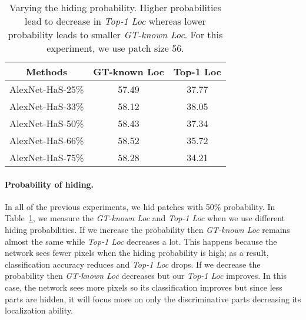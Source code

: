 \documentclass[10pt,twocolumn,letterpaper]{article}
\begin{document}
\begin{table}[t!]
              \begin{center}
                  \footnotesize
                  \begin{tabular}{| c | c | c|}
                  \hline    	
                  Methods & GT-known Loc &  Top-1 Loc\\
                  \hline

                  AlexNet-HaS-25\%            & 57.49 & 37.77  \\
                  AlexNet-HaS-33\%          & 58.12 & 38.05  \\
                  AlexNet-HaS-50\%            & 58.43 & 37.34  \\
                  AlexNet-HaS-66\%            &  58.52  & 35.72  \\
                  AlexNet-HaS-75\%             &  58.28  & 34.21  \\

                  \hline
                   \end{tabular}
                          \caption{Varying the hiding probability. Higher probabilities lead to decrease in \emph{Top-1 Loc} whereas lower probability leads to smaller \emph{GT-known Loc}. For this experiment, we use patch size 56.}
                          \label{table:drop_percent_results}
                          \end{center}
                          \vspace*{-0.13in}
                          \end{table}\vspace{-10pt}\paragraph{Probability of hiding.} In all of the previous experiments, we hid patches with 50\% probability. In Table~\ref{table:drop_percent_results}, we measure the \emph{GT-known Loc} and \emph{Top-1 Loc} when we use different hiding probabilities.  If we increase the probability then \emph{GT-known Loc} remains almost the same while \emph{Top-1 Loc} decreases a lot. This happens because the network sees fewer pixels when the hiding probability is high; as a result, classification accuracy reduces and \emph{Top-1 Loc} drops.  If we decrease the probability then \emph{GT-known Loc} decreases but our \emph{Top-1 Loc} improves.  In this case, the network sees more pixels so its classification improves but since less parts are hidden, it will focus more on only the discriminative parts decreasing its localization ability.
\end{document}
